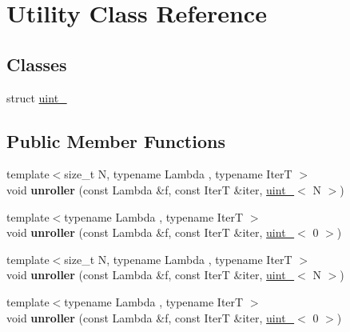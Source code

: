 \hypertarget{classUtility}{}\section{Utility Class Reference}
\label{classUtility}
\subsection*{Classes}
\begin{DoxyCompactItemize}
\item 
struct \hyperlink{structUtility_1_1uint__}{uint\+\_\+}
\end{DoxyCompactItemize}
\subsection*{Public Member Functions}
\begin{DoxyCompactItemize}
\item 
\mbox{\label{classUtility_a98ec0cf249612a2107ff995ea7bf7b6c}} 
{\footnotesize template$<$size\+\_\+t N, typename Lambda , typename IterT $>$ }\\void {\bfseries unroller} (const Lambda \&f, const IterT \&iter, \hyperlink{structUtility_1_1uint__}{uint\+\_\+}$<$ N $>$)
\item 
\mbox{\label{classUtility_a51a15b66637be38508b088202b41acb1}} 
{\footnotesize template$<$typename Lambda , typename IterT $>$ }\\void {\bfseries unroller} (const Lambda \&f, const IterT \&iter, \hyperlink{structUtility_1_1uint__}{uint\+\_\+}$<$ 0 $>$)
\item 
\mbox{\label{classUtility_a98ec0cf249612a2107ff995ea7bf7b6c}} 
{\footnotesize template$<$size\+\_\+t N, typename Lambda , typename IterT $>$ }\\void {\bfseries unroller} (const Lambda \&f, const IterT \&iter, \hyperlink{structUtility_1_1uint__}{uint\+\_\+}$<$ N $>$)
\item 
\mbox{\label{classUtility_a51a15b66637be38508b088202b41acb1}} 
{\footnotesize template$<$typename Lambda , typename IterT $>$ }\\void {\bfseries unroller} (const Lambda \&f, const IterT \&iter, \hyperlink{structUtility_1_1uint__}{uint\+\_\+}$<$ 0 $>$)
\end{DoxyCompactItemize}
